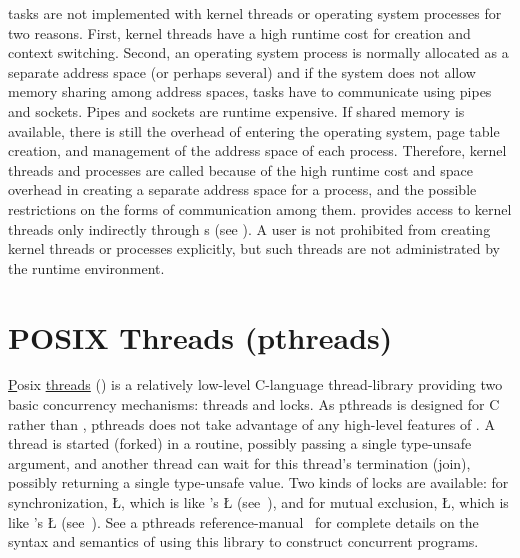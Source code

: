 \documentclass[openright,twoside]{report}
\begin{document}
\begin{annotation}
\uC tasks are not implemented with kernel threads or operating system processes for two reasons.
First, kernel threads have a high runtime cost for creation and context switching.
Second, an operating system process is normally allocated as a separate address space (or perhaps several) and if the system does not allow memory sharing among address spaces, tasks have to communicate using pipes and sockets.
Pipes and sockets are runtime expensive.
If shared memory is available, there is still the overhead of entering the operating system, page table creation, and management of the address space of each process.
Therefore, kernel threads and processes are called  because of the high runtime cost and space overhead in creating a separate address space for a process, and the possible restrictions on the forms of communication among them.
\uC provides access to kernel threads only indirectly through s (see ).
A user is not prohibited from creating kernel threads or processes explicitly, but such threads are not administrated by the \uC runtime environment.
\end{annotation}


\chapter{POSIX Threads (pthreads)}
\label{c:POSIXThreads}

\underline{P}osix \underline{threads} () is a relatively low-level C-language thread-library providing two basic concurrency mechanisms: threads and locks.
As pthreads is designed for C rather than \CC, pthreads does not take advantage of any high-level features of \CC.
A thread is started (forked) in a routine, possibly passing a single type-unsafe argument, and another thread can wait for this thread's termination (join), possibly returning a single type-unsafe value.
Two kinds of locks are available: for synchronization, \LGinlinetrue\LGbegin\lgrinde\L{}\endlgrinde\LGend{}, which is like \uC's \LGinlinetrue\LGbegin\lgrinde\L{}\endlgrinde\LGend{} (see~), and for mutual exclusion, \LGinlinetrue\LGbegin\lgrinde\L{}\endlgrinde\LGend{}, which is like \uC's \LGinlinetrue\LGbegin\lgrinde\L{}\endlgrinde\LGend{} (see~).
See a pthreads reference-manual~\cite{Butenhof97} for complete details on the syntax and semantics of using this library to construct concurrent programs.
\end{document}
